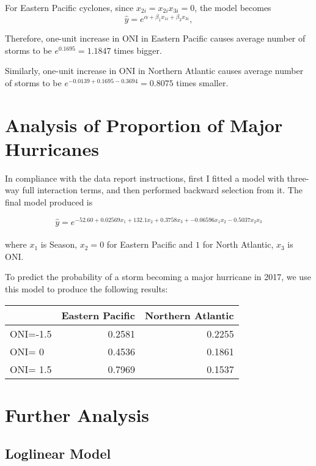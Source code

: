 \documentclass[12pt,a4paper]{article}
\begin{document}
For Eastern Pacific cyclones, since $x_{2i}=x_{2i}x_{3i} = 0$, the model becomes $$\hat{y}=e^{\alpha+\beta_1x_{1i} + \beta_3x_{3i}}, $$

Therefore, one-unit increase in ONI in Eastern Pacific causes average number of storms to be $e^{0.1695} = 1.1847$ times bigger.

Similarly, one-unit increase in ONI in Northern Atlantic causes average number of storms to be $e^{-0.0139+0.1695-0.3694} = 0.8075$ times smaller.

\section{Analysis of Proportion of Major Hurricanes}

In compliance with the data report instructions, first I fitted a model with three-way full interaction terms, and then performed backward selection from it. The final model produced is 

$$\hat{y} = e^{ -52.60+0.02569x_1 + 132.1x_2 +0.3758x_3+ -0.06596x_1x_2-0.5037x_2x_3}$$
\\where $x_1$ is Season, $x_2 = 0$ for Eastern Pacific and $1$ for North Atlantic, $x_3$ is ONI.

To predict the probability of a storm becoming a major hurricane in 2017, we use this model to produce the following results:
\begin{center}
	

\begin{tabular}{l|rr}
		& Eastern Pacific & Northern Atlantic\\ \hline
	ONI=-1.5 &0.2581 &0.2255\\
	ONI= 0 &0.4536 &0.1861\\
	ONI= 1.5 &0.7969 &0.1537
\end{tabular}
\end{center}

\section{Further Analysis}

\subsection{Loglinear Model}
\end{document}
